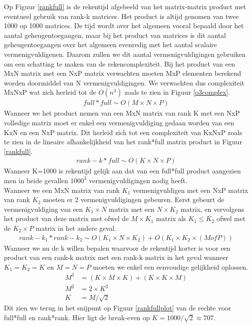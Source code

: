 \documentclass[a4paper]{article}
\begin{document}
Op Figuur \ref{rankfull} is de rekentijd afgebeeld van het matrix-matrix product met eventueel gebruik van rank-k matrices. Het product is altijd genomen van twee 1000 op 1000 matrices. De tijd wordt over het algemeen vooral bepaald door het aantal geheugentoegangen, maar bij het product van matrices is dit aantal geheugentoegangen over het algemeen evenredig met het aantal scalaire vermenigvuldigenen. Daarom zullen we dit aantal vermenigvuldigingen gebruiken om een schatting te maken van de rekencomplexiteit. Bij het product van een MxN matrix met een NxP matrix verwachten moeten MxP elementen berekend worden doormiddel van N vermenigvuldigingen. We verwachten dus complexiteit MxNxP wat zich herleid tot de \(O(n^3)\) zoals te zien in Figuur \ref{o3complex}.
\begin{equation}
\label{fullfull}
\begin{aligned}
	full*full \sim O(M\times N\times P)
\end{aligned}
\end{equation}
Wanneer we het product nemen van een MxN matrix van rank K met een NxP volledige matrix moet er enkel een vermenigvuldiging gedaan worden van een KxN en een NxP matrix. Dit herleid zich tot een complexiteit van KxNxP zoals te zien in de lineaire afhankelijkheid van het rank*full matrix product in Figuur \ref{rankfull}.
\begin{equation}
\label{rankfull}
\begin{aligned}
	rank-k*full \sim O(K\times N\times P)
\end{aligned}
\end{equation}
Wanneer K=1000 is rekentijd gelijk aan dat van een full*full product aangezien men in beide gevallen \(1000^3\) vermenigvuldigingen nodig heeft.\\
Wanneer we een MxN matrix van rank $K_1$ vermenigvuldigen met een NxP matrix van rank $K_2$ moeten er 2 vermenigvuldigingen gebeuren. Eerst gebeurt de vermenigvuldiging van een $K_1\times N$ matrix met een $N\times K_2$ matrix, en vervolgens het product van deze matrix met ofwel de $M\times K_1$ matrix als \(K_1 \leq K_2\) ofwel met de $K_2\times P$ matrix in het andere geval.
\begin{equation}
\label{rankrank}
\begin{aligned}
	rank-k_1*rank-k_2 \sim O(K_1\times N\times K_2) + O(K_1\times K_2\times (M of P))
\end{aligned}
\end{equation}
Wanneer we nu de k willen bepalen waarvoor de rekentijd korter is voor een product van een rank-k matrix met een rank-k matrix in het geval wanneer $K_1 = K_2 = K$ en $M=N=P$ moeten we enkel een eenvoudige gelijkheid oplossen.
\begin{equation}
\label{break-evenK}
\begin{aligned}
	M^3 &= (K\times M\times K) + (K\times K\times M) \\
	M^2 &= 2\times K^2 \\
	K &= M/\sqrt{2}
\end{aligned}
\end{equation}
Dit zien we terug in het snijpunt op Figuur \ref{rankfullplot} van de rechte voor full*full en rank*rank. Hier ligt de break-even op $K=1000/\sqrt{2} \approx 707$.
\end{document}
